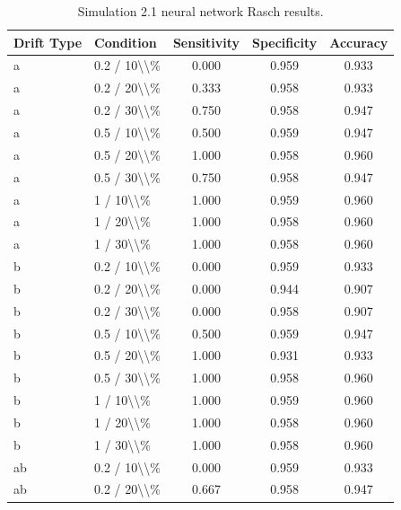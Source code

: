 \begin{table}[!h]
\centering
\caption{\label{tab:tab:sim21_nn_rasch}Simulation 2.1 neural network Rasch results.}
\centering
\begin{tabular}[t]{llccc}
\toprule
Drift Type & Condition & Sensitivity & Specificity & Accuracy\\
\midrule
a & 0.2 / 10\textbackslash{}\textbackslash{}\% & 0.000 & 0.959 & 0.933\\
a & 0.2 / 20\textbackslash{}\textbackslash{}\% & 0.333 & 0.958 & 0.933\\
a & 0.2 / 30\textbackslash{}\textbackslash{}\% & 0.750 & 0.958 & 0.947\\
a & 0.5 / 10\textbackslash{}\textbackslash{}\% & 0.500 & 0.959 & 0.947\\
a & 0.5 / 20\textbackslash{}\textbackslash{}\% & 1.000 & 0.958 & 0.960\\
\addlinespace
a & 0.5 / 30\textbackslash{}\textbackslash{}\% & 0.750 & 0.958 & 0.947\\
a & 1 / 10\textbackslash{}\textbackslash{}\% & 1.000 & 0.959 & 0.960\\
a & 1 / 20\textbackslash{}\textbackslash{}\% & 1.000 & 0.958 & 0.960\\
a & 1 / 30\textbackslash{}\textbackslash{}\% & 1.000 & 0.958 & 0.960\\
b & 0.2 / 10\textbackslash{}\textbackslash{}\% & 0.000 & 0.959 & 0.933\\
\addlinespace
b & 0.2 / 20\textbackslash{}\textbackslash{}\% & 0.000 & 0.944 & 0.907\\
b & 0.2 / 30\textbackslash{}\textbackslash{}\% & 0.000 & 0.958 & 0.907\\
b & 0.5 / 10\textbackslash{}\textbackslash{}\% & 0.500 & 0.959 & 0.947\\
b & 0.5 / 20\textbackslash{}\textbackslash{}\% & 1.000 & 0.931 & 0.933\\
b & 0.5 / 30\textbackslash{}\textbackslash{}\% & 1.000 & 0.958 & 0.960\\
\addlinespace
b & 1 / 10\textbackslash{}\textbackslash{}\% & 1.000 & 0.959 & 0.960\\
b & 1 / 20\textbackslash{}\textbackslash{}\% & 1.000 & 0.958 & 0.960\\
b & 1 / 30\textbackslash{}\textbackslash{}\% & 1.000 & 0.958 & 0.960\\
ab & 0.2 / 10\textbackslash{}\textbackslash{}\% & 0.000 & 0.959 & 0.933\\
ab & 0.2 / 20\textbackslash{}\textbackslash{}\% & 0.667 & 0.958 & 0.947\\

\end{tabular}
\end{table}
